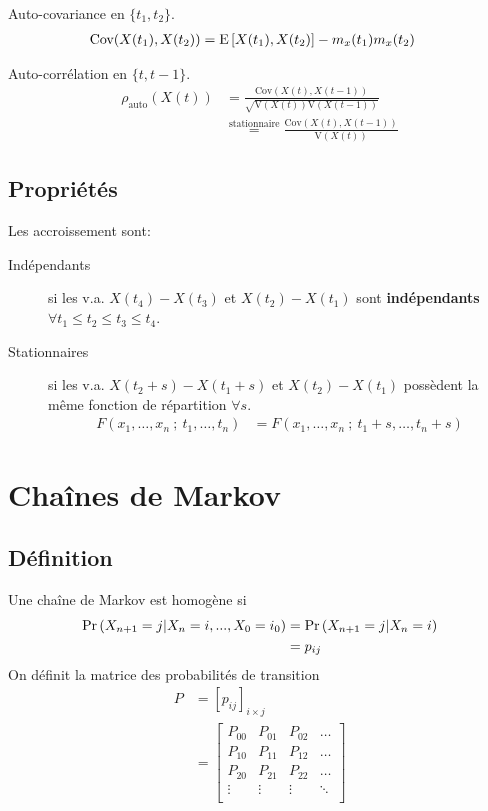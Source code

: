 \documentclass[10pt, french]{article}
\begin{document}
\begin{multicols*}{2}
Auto-covariance en $\{t_{1}, t_{2} \}$.
\begin{align*}
	\text{Cov}(X(t_{1}), X(t_{2})) &= \mathrm{E} \left[ X(t_{1}),X(t_{2}) \right] - m_{x}(t_{1}) m_{x}(t_{2})
\end{align*}

Auto-corrélation en $\{t, t - 1 \}$.
\begin{align*}
	\rho_{\text{auto}}(X(t)) &= \frac{\text{Cov}(X(t), X(t - 1))}{\sqrt{\text{V}(X(t))\text{V}(X(t - 1))}} \\
	&\overset{\text{stationnaire}}=  \frac{\text{Cov}(X(t), X(t - 1))}{\text{V}(X(t))}
\end{align*}

\subsection*{Propriétés}

Les accroissement sont:
\begin{description}
	\item[Indépendants] si les v.a. $X(t_{4}) - X(t_{3})$ et $X(t_{2}) - X(t_{1})$ sont \textbf{indépendants} $\forall	t_{1} \le t_{2} \le t_{3} \le t_{4}$.
	\item[Stationnaires] si les v.a. $X(t_{2} + s) - X(t_{1} + s)$ et $X(t_{2}) - X(t_{1})$ possèdent la même fonction de répartition $\forall	s$.
	\begin{align*}
		F(x_{1}, \dots, x_{n} \ ; \ t_{1}, \dots, t_{n}) &= F(x_{1}, \dots, x_{n} \ ; \ t_{1} + s, \dots, t_{n} + s)
	\end{align*}
\end{description}



\section{Chaînes de Markov}
\subsection*{Définition}
Une chaîne de Markov est homogène si
\begin{align*}
\Pr \left( X_{n+1} = j | X_{n}=i, ..., X_0 = i_0 \right) & = \Pr \left( X_{n+1} = j | X_n = i \right)  \\
 & = p_{ij} \\
\end{align*}
On définit la matrice des probabilités de transition
\begin{align*}
P &= [p_{ij}]_{i \times j} \\
&= \left[
\begin{matrix}
	P_{00} & P_{01} & P_{02} & \dots \\
	P_{10} & P_{11} & P_{12} & \dots \\
	P_{20} & P_{21} & P_{22} & \dots \\
	\vdots & \vdots & \vdots & \ddots \\
\end{matrix}
\right]
\end{align*}


\end{multicols*}
\end{document}

